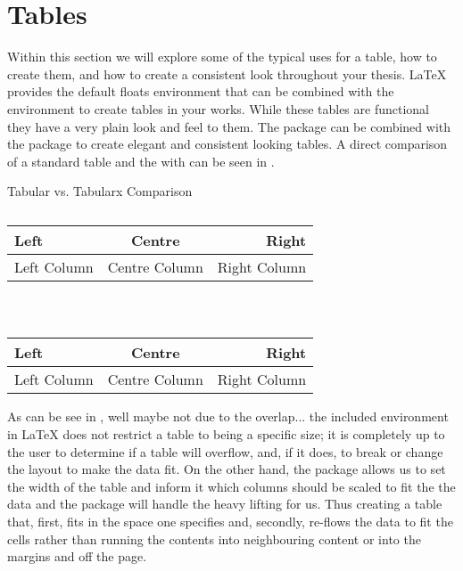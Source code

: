 	\section{Tables}
		Within this section we will explore some of the typical uses for a table, how to create them, and how to create a consistent look throughout your thesis.
		\LaTeX{} provides the default floats environment  that can be combined with the  environment to create tables in your works. 
		While these tables are functional they have a very plain look and feel to them.
		The package  can be combined with the  package to create elegant and consistent looking tables.
		A direct comparison of a standard table and the  with  can be seen in .
		\begin{table}[H]
			\caption{Tabular vs. Tabularx Comparison}
			\label{tab:tableComparison}
			\centering
			\begin{subtable}{0.45\textwidth}
				\caption{}
				\label{tab:tableComparison:b}
				\begin{tabular}{lcr} 
					\hline
						\textbf{Left} & \textbf{Centre} & \textbf{Right}\\%
					\hline
						Left Column & Centre Column & Right Column \\%
					\hline
				\end{tabular}
			\end{subtable}
			~
			\begin{subtable}{0.45\textwidth}
				\caption{}
				\label{tab:tableComparison:a}
				\begin{tabularx}{\textwidth}{LCR} 
					\toprule
						\textbf{Left} & \textbf{Centre} & \textbf{Right}\\
					\midrule
						Left Column & Centre Column & Right Column \\
					\bottomrule
				\end{tabularx}
			\end{subtable}
		\end{table}
		As can be see in , well maybe not due to the overlap... the included  environment in \LaTeX{} does not restrict a table to being a specific size; it is completely up to the user to determine if a table will overflow, and, if it does, to break or change the layout to make the data fit.
		On the other hand, the  package allows us to set the width of the table and inform it which columns should be scaled to fit the the data and the  package will handle the heavy lifting for us.
		Thus creating a table that, first, fits in the space one specifies and, secondly, re-flows the data to fit the cells rather than running the contents into neighbouring content or into the margins and off the page.
  
